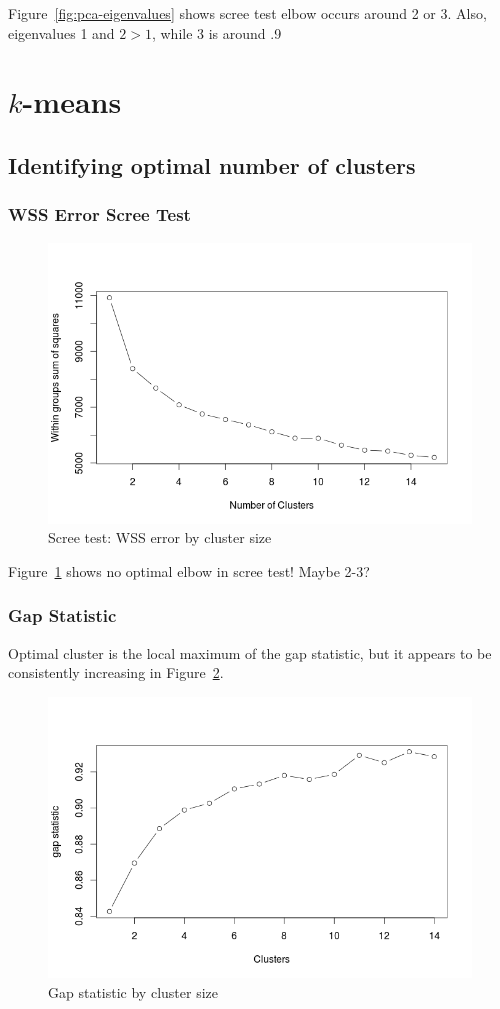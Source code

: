 \documentclass[letterpaper,12pt]{article}
\begin{document}
Figure~\ref{fig:pca-eigenvalues} shows scree test elbow occurs around 2 or 3. Also, eigenvalues 1 and $2 > 1$, while 3
is around .9

\section{$k$-means}
\subsection{Identifying optimal number of clusters}

\subsubsection{WSS Error Scree Test}

\begin{figure}[ht]
  \centering
  \includegraphics[width=0.8\linewidth]{kmeans-wss-error.png}
  \caption{Scree test: WSS error by cluster size}
  \label{fig:kmeans-wss-error}
\end{figure}

Figure~\ref{fig:kmeans-wss-error} shows no optimal elbow in scree test! Maybe 2-3?

\subsubsection{Gap Statistic}

Optimal cluster is the local maximum of the gap statistic, but it appears to be
consistently increasing in Figure~\ref{fig:gap-statistic}.

\begin{figure}[ht]
  \centering
  \includegraphics[width=0.8\linewidth]{gap-statistic.png}
  \caption{Gap statistic by cluster size}
  \label{fig:gap-statistic}
\end{figure}
\end{document}

